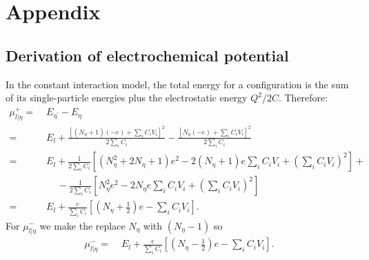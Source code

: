 \documentclass[a4paper,11pt]{article}
\begin{document}
    \newpage
    
    

    \newpage
    \appendix
    \section{Appendix}
    \subsection{Derivation of electrochemical potential}\label{sec:Chemical_potential}
    In the constant interaction model, the total energy for a configuration is the sum of its single-particle energies plus the electrostatic energy $Q^2/2C$. Therefore:
    \begin{align*}
        \mu_{l|\eta}^+ =\; &E_{\eta^\prime} - E_{\eta} \\
        =\; &E_l + \frac{\left[\left(N_{\eta}+1\right)\left(-e\right) + \sum\nolimits_i C_i V_i\right]^2}{2\sum\nolimits_i C_i} - \frac{\left[N_{\eta}\left(-e\right) + \sum\nolimits_i C_i V_i\right]^2}{2\sum\nolimits_i C_i} \\
        =\; &E_l + \frac{1}{2\sum\nolimits_i C_i}\left[\left(N_{\eta}^2 + 2N_{\eta} + 1\right)e^2 - 2 \left(N_{\eta} + 1\right)e\sum_i C_i V_i + \left(\sum_i C_i V_i\right)^2\right] + \\
        &\;\;\;\;- \frac{1}{2\sum\nolimits_i C_i}\left[N_{\eta}^2 e^2 - 2 N_{\eta} e\sum_i C_i V_i + \left(\sum_i C_i V_i\right)^2\right] \\
        =\; &E_l + \frac{e}{\sum\nolimits_i C_i}\left[\left(N_{\eta} + \frac{1}{2}\right)e - \sum_i C_i V_i\right].
    \end{align*}
    For $\mu_{l|\eta}^-$ we make the replace $N_{\eta}$ with $\left(N_{\eta} - 1\right)$ so
    \begin{align*}
        \mu_{l|\eta}^- =\; &E_l + \frac{e}{\sum\nolimits_i C_i}\left[\left(N_{\eta} - \frac{1}{2}\right)e - \sum_i C_i V_i\right].
    \end{align*}
\end{document}
